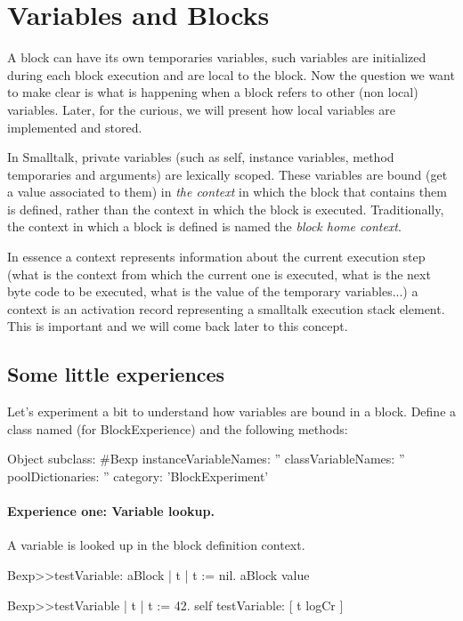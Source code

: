 \documentclass[a4paper,10pt,twoside]{book}
\begin{document}
\section{Variables and Blocks}
A block can have its own temporaries variables, such variables are initialized during each block execution and are local to the block. Now the question we want to make clear is what is happening when a block refers to other (non local) variables. Later, for the curious, we will present how local variables are implemented and stored.

In Smalltalk, private variables (such as self, instance variables, method temporaries and arguments) are lexically scoped. These variables are bound (get a value associated to them) in \emph{the context} in which the block that contains them is defined, rather than the context in which the block is executed.  Traditionally, the context in which a block is defined is named the \emph{block home context}.

In essence a context represents information about the current execution step (what is the context from which the current one is executed, what is the next byte code to be executed, what is the value of the temporary variables...) a context is an activation record representing a smalltalk execution stack element. This is important and we will come back later to this concept.

\subsection{Some little experiences}

Let's experiment a bit to understand how variables are bound in a block. Define a class named  (for BlockExperience) and the following methods:

\begin{code}{}
Object subclass: #Bexp
	instanceVariableNames: ''
	classVariableNames: ''
	poolDictionaries: ''
	category: 'BlockExperiment'
\end{code}

\paragraph{Experience one: Variable lookup.} A variable is looked up in the block definition context.



\begin{code}{}
Bexp>>testVariable: aBlock
	| t |
	t := nil.
	aBlock value

Bexp>>testVariable
	| t |
	t := 42.
	self testVariable: [ t logCr ]
\end{code}
\end{document}
